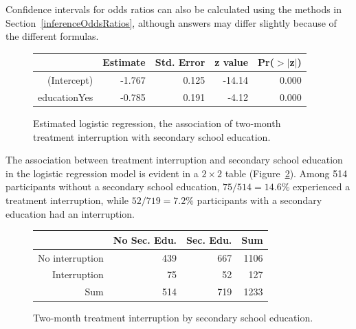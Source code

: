 Confidence intervals for odds ratios can also be calculated using the methods in Section~\ref{inferenceOddsRatios}, although answers may differ slightly because of the different formulas.

\begin{figure}[ht]
\centering
\begin{tabular}{rrrrr}
  \hline
 & Estimate & Std. Error & z value & Pr($>$$|$z$|$) \\
  \hline
(Intercept) & -1.767 & 0.125 & -14.14 & 0.000 \\
  educationYes & -0.785 & 0.191 & -4.12 & 0.000 \\
   \hline
\end{tabular}
\caption{Estimated logistic regression, the association of two-month treatment interruption with secondary school education.}
\label{figure:tbInterruptionEduLogReg}
\end{figure}

The association between treatment interruption and secondary school education in the logistic regression model is evident in a $2 \times 2$ table (Figure~\ref{figure:tbInterruptionEduExample}). Among 514 participants without a secondary school education, $75/514 = 14.6\%$ experienced a treatment interruption, while $52/719 = 7.2\%$ participants with a secondary education had an interruption.


\begin{figure}[ht]
\centering
\begin{tabular}{rrrr}
  \hline
 & No Sec. Edu. & Sec. Edu. & Sum \\
  \hline
No interruption & 439 & 667 & 1106 \\
  Interruption & 75 & 52 & 127 \\
  Sum & 514 & 719 & 1233 \\
   \hline
\end{tabular}
\caption{Two-month treatment interruption by secondary school education.}
\label{figure:tbInterruptionEduExample}
\end{figure}

